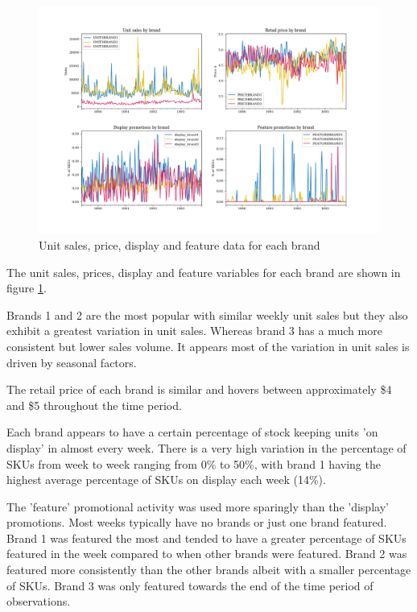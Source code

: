 \documentclass[a4paper,11pt]{article}
\begin{document}
\begin{figure}
  \centering
  \includegraphics[scale=0.38]{eda_plots}
  \caption{Unit sales, price, display and feature data for each brand}\label{fig:eda-plots}
\end{figure}

The unit sales, prices, display and feature variables for each brand are shown in figure \ref{fig:eda-plots}. 

Brands 1 and 2 are the most popular with similar weekly unit sales but they also exhibit a greatest variation in unit sales. Whereas brand 3 has a much more consistent but lower sales volume. It appears most of the variation in unit sales is driven by seasonal factors.

The retail price of each brand is similar and hovers between approximately \$4 and \$5 throughout the time period. 

Each brand appears to have a certain percentage of stock keeping units 'on display' in almost every week. There is a very high variation in the percentage of SKUs from week to week ranging from 0\% to 50\%, with brand 1 having the highest average percentage of SKUs on display each week (14\%).

The 'feature' promotional activity was used more sparingly than the 'display' promotions. Most weeks typically have no brands or just one brand featured. Brand 1 was featured the most and tended to have a greater percentage of SKUs featured in the week compared to when other brands were featured. Brand 2 was featured more consistently than the other brands albeit with a smaller percentage of SKUs. Brand 3 was only featured towards the end of the time period of observations. 
\end{document}
